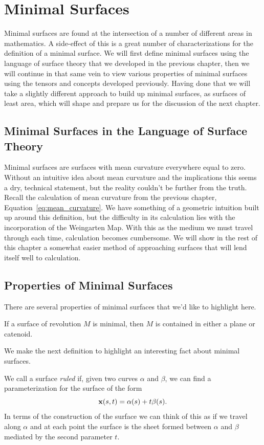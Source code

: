\section{Minimal Surfaces}

Minimal surfaces are found at the intersection of a number of different areas in mathematics. A side-effect of this is a great number of characterizations for the definition of a minimal surface. We will first define minimal surfaces using the language of surface theory that we developed in the previous chapter, then we will continue in that same vein to view various properties of minimal surfaces using the tensors and concepts developed previously. Having done that we will take a slightly different approach to build up minimal surfaces, as surfaces of least area, which will shape and prepare us for the discussion of the next chapter.

\subsection{Minimal Surfaces in the Language of Surface Theory}

  Minimal surfaces are surfaces with mean curvature everywhere equal to zero. Without an intuitive idea about mean curvature and the implications this seems a dry, technical statement, but the reality couldn't be further from the truth. Recall the calculation of mean curvature from the previous chapter, Equation~\ref{eq:mean_curvature}. We have something of a geometric intuition built up around this definition, but the difficulty in its calculation lies with the incorporation of the Weingarten Map. With this as the medium we must travel through each time, calculation becomes cumbersome. We will show in the rest of this chapter a somewhat easier method of approaching surfaces that will lend itself well to calculation.  

\subsection{Properties of Minimal Surfaces}
  There are several properties of minimal surfaces that we'd like to highlight here.

  \begin{thm}
    If a surface of revolution $M$ is minimal, then $M$ is contained in either a plane or catenoid.
  \end{thm}

  We make the next definition to highlight an interesting fact about minimal surfaces.
  \begin{defn}
    We call a surface \emph{ruled} if, given two curves $\alpha$ and $\beta$, we can find a parameterization for the surface of the form
    \[
      \mathbf{x}(s, t) = \alpha(s) + t\beta(s).
    \]
    In terms of the construction of the surface we can think of this as if we travel along $\alpha$ and at each point the surface is the sheet formed between $\alpha$ and $\beta$ mediated by the second parameter $t$. 
  \end{defn}

